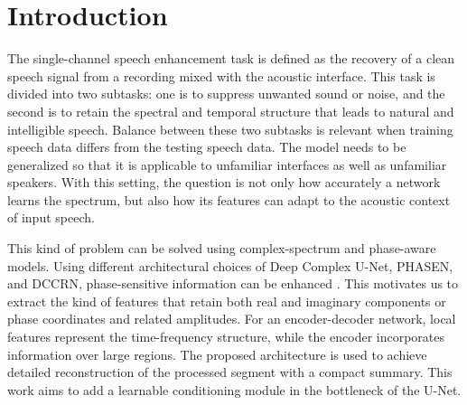 \documentclass[10pt,a4paper]{article}
\begin{document}
\section{Introduction}
The single-channel speech enhancement task is defined as the recovery of a clean speech signal from a recording mixed with the acoustic interface. This task is divided into two subtasks: one is to suppress unwanted sound or noise, and the second is to retain the spectral and temporal structure that leads to natural and intelligible speech. Balance between these two subtasks is relevant when training speech data differs from the testing speech data. The model needs to be generalized so that it is applicable to unfamiliar interfaces as well as unfamiliar speakers. With this setting, the question is not only how accurately a network learns the spectrum, but also how its features can adapt to the acoustic context of input speech. 


This kind of problem can be solved using complex-spectrum and phase-aware models. Using different architectural choices of Deep Complex U-Net, PHASEN, and DCCRN, phase-sensitive information can be enhanced \cite{dcunet,phasen,dccrn}. This motivates us to extract the kind of features that retain both real and imaginary components or phase coordinates and related amplitudes. For an encoder-decoder network, local features represent the time-frequency structure, while the encoder incorporates information over large regions. The proposed architecture is used to achieve detailed reconstruction of the processed segment with a compact summary. This work aims to add a learnable conditioning module in the bottleneck of the U-Net.

\end{document}
